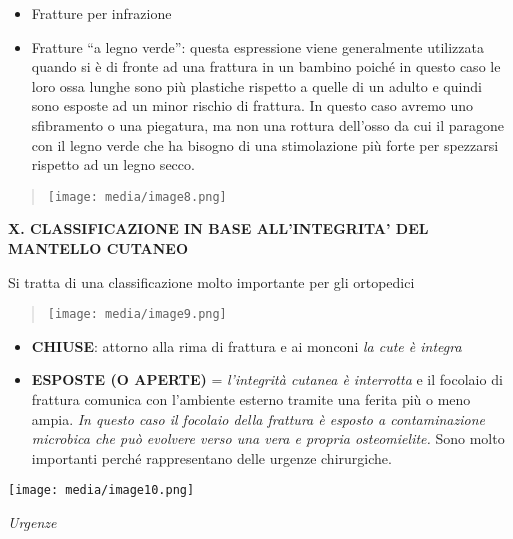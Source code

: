 \documentclass[]{article}
\begin{document}
\begin{itemize}
\item
  Fratture per infrazione
\item
  Fratture ``a legno verde'': questa espressione viene generalmente
  utilizzata quando si è di fronte ad una frattura in un bambino poiché
  in questo caso le loro ossa lunghe sono più plastiche rispetto a
  quelle di un adulto e quindi sono esposte ad un minor rischio di
  frattura. In questo caso avremo uno sfibramento o una piegatura, ma
  non una rottura dell'osso da cui il paragone con il legno verde che ha
  bisogno di una stimolazione più forte per spezzarsi rispetto ad un
  legno secco.
\end{itemize}

\begin{quote}
\texttt{[image: media/image8.png]}
\end{quote}

\textbf{X. CLASSIFICAZIONE IN BASE ALL'INTEGRITA' DEL MANTELLO CUTANEO}

Si tratta di una classificazione molto importante per gli ortopedici

\begin{quote}
\texttt{[image: media/image9.png]}
\end{quote}

\begin{itemize}
\item
  \textbf{CHIUSE}: attorno alla rima di frattura e ai monconi \emph{la
  cute è integra}
\item
  \textbf{ESPOSTE (O APERTE)} = \emph{l'integrità cutanea è interrotta}
  e il focolaio di frattura comunica con l'ambiente esterno tramite una
  ferita più o meno ampia. \emph{In questo caso il focolaio della
  frattura è esposto a contaminazione microbica che può evolvere verso
  una vera e propria osteomielite.} Sono molto importanti perché
  rappresentano delle urgenze chirurgiche.
\end{itemize}

\texttt{[image: media/image10.png]}

\emph{Urgenze}
\end{document}
